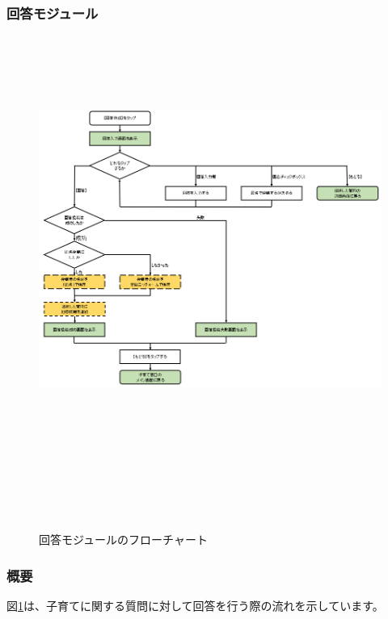 \documentclass[a4j]{jarticle}
\begin{document}
\subsubsection{回答モジュール\label{回答}} %
\begin{figure}[H]
    \begin{center}
      \includegraphics[height = 14.0cm] {子育て窓口_回答.png} %
    \caption {回答モジュールのフローチャート}
    \label{子育て窓口_回答}　
    \end{center}　
\end{figure}
\subsubsection*{概要}
図\ref{子育て窓口_回答}は、子育てに関する質問に対して回答を行う際の流れを示しています。
\end{document}
